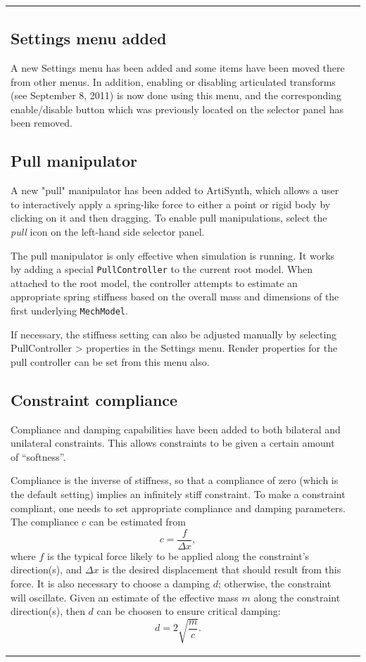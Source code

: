 \documentclass{article}
\begin{document}
\begin{tabular}{ll}
\subsection*{Settings menu added}

A new {\sf Settings} menu has been added and some items have been
moved there from other menus. In addition, enabling or disabling
articulated transforms (see September 8, 2011) is now done using this
menu, and the corresponding enable/disable button which was previously
located on the selector panel has been removed.

\subsection*{Pull manipulator}

A new "pull" manipulator has been added to ArtiSynth, which allows a
user to interactively apply a spring-like force to either a point or 
rigid body by clicking on it and then dragging. To enable pull
manipulations, select the {\it pull} icon on the left-hand side
selector panel.

The pull manipulator is only effective when simulation is running.  It
works by adding a special {\tt PullController} to the current root
model. When attached to the root model, the controller attempts to
estimate an appropriate spring stiffness based on the overall mass and
dimensions of the first underlying {\tt MechModel}.

If necessary, the stiffness setting can also be adjusted manually by
selecting {\sf PullController > properties} in the {\sf Settings}
menu.  Render properties for the pull controller can be set from this
menu also.

\subsection*{Constraint compliance}

Compliance and damping capabilities have been added to both bilateral
and unilateral constraints. This allows constraints to be
given a certain amount of ``softness''.

Compliance is the inverse of stiffness, so that a compliance of zero
(which is the default setting) implies an infinitely stiff constraint.
To make a constraint compliant, one needs to set appropriate
compliance and damping parameters. The compliance $c$ can
be estimated from
\[
c = \frac{f}{\Delta x},
\]
where $f$ is the typical force likely to be applied along the
constraint's direction(s), and $\Delta x$ is the desired displacement
that should result from this force. It is also necessary to choose a
damping $d$; otherwise, the constraint will oscillate. Given an
estimate of the effective mass $m$ along the constraint direction(s),
then $d$ can be choosen to ensure critical damping:
\[
d = 2 \sqrt{\frac{m}{c}}.
\]


\end{tabular}
\end{document}
